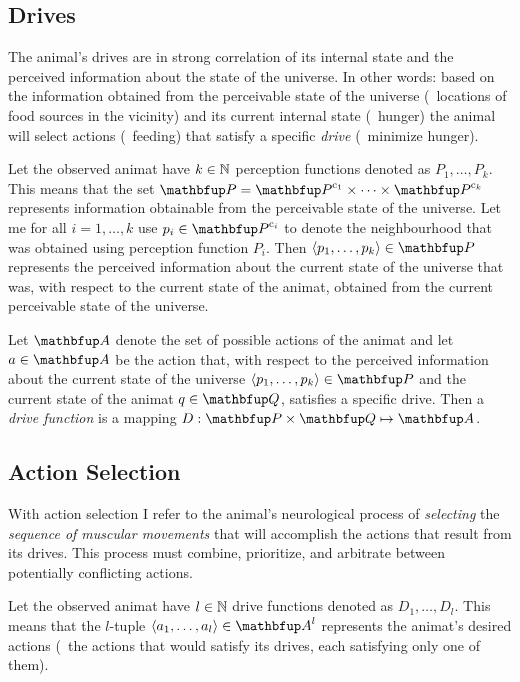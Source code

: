 \subsection{Drives}
The animal's drives are in strong correlation of its internal state and the perceived information about the state of the universe. In other words: based on the information obtained from the perceivable state of the universe (\eg\ locations of food sources in the vicinity) and its current internal state (\eg\ hunger) the animal will select actions (\eg\ feeding) that satisfy a specific \emph{drive} (\eg\ minimize hunger).

Let the observed animat have $k \in \mathbb{N}$ perception functions denoted as $P_1,\ldots,P_k$. This means that the set $\set{P}=\set{P}^{\mathrm{c}_1} \times \cdots \times \set{P}^{\mathrm{c}_k}$ represents information obtainable from the perceivable state of the universe. Let me for all $i=1,\ldots,k$ use $p_i \in  \set{P}^{\mathrm{c}_i}$ to denote the neighbourhood that was obtained using perception function $P_i$. Then $\langle p_1,\ldots,p_k\rangle \in \set{P}$ represents the perceived information about the current state of the universe that was, with respect to the current state of the animat, obtained from the current perceivable state of the universe. 

\begin{definition}
\label{def:animat:Dj}
Let $\set{A}$ denote the set of possible actions of the animat and let $a \in \set{A}$ be the action that, with respect to the perceived information about the current state of the universe $\langle p_1,\ldots,p_k\rangle \in \set{P}$ and the current state of the animat $q \in \set{Q}$, satisfies a specific drive. Then a \emph{drive function} is a mapping $D: \set{P} \times \set{Q} \mapsto \set{A}$.
\end{definition}

\subsection{Action Selection}
With action selection I refer to the animal's neurological process of \emph{selecting} the \emph{sequence of muscular movements} that will accomplish the actions that result from its drives. This process must combine, prioritize, and arbitrate between potentially conflicting actions. 

Let the observed animat have $l \in \mathbb{N}$ drive functions denoted as $D_1,\ldots,D_l$. This means that the $l$-tuple $\langle a_1,\ldots,a_l\rangle \in \set{A}^l$ represents the animat's desired actions (\ie\ the actions that would satisfy its drives, each satisfying only one of them). 

